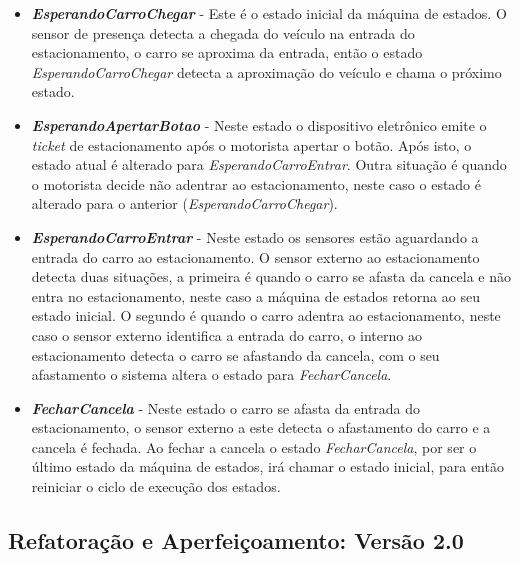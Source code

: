 \begin{itemize}
	\item \textit{\textbf{EsperandoCarroChegar}} - Este é o estado inicial da máquina de estados. O sensor de presença detecta a chegada do veículo na entrada do estacionamento, o carro se aproxima da entrada, então o estado \textit{EsperandoCarroChegar} detecta a aproximação do veículo e chama o próximo estado.
	
	\item \textit{\textbf{EsperandoApertarBotao}} - Neste estado o dispositivo eletrônico emite o \textit{ticket} de estacionamento após o motorista apertar o botão. Após isto, o estado atual é alterado para \textit{EsperandoCarroEntrar}. Outra situação é quando o motorista decide não adentrar ao estacionamento, neste caso o estado é alterado para o anterior (\textit{EsperandoCarroChegar}). 
	
	\item \textit{\textbf{EsperandoCarroEntrar}} - Neste estado os sensores estão aguardando a entrada do carro ao estacionamento. O sensor externo ao estacionamento detecta duas situações, a primeira é quando o carro se afasta da cancela e não entra no estacionamento, neste caso a máquina de estados retorna ao seu estado inicial. O segundo é quando o carro adentra ao estacionamento, neste caso o sensor externo identifica a entrada do carro, o interno ao estacionamento detecta o carro se afastando da cancela, com o seu afastamento o sistema altera o estado para \textit{FecharCancela}.
	
	\item \textit{\textbf{FecharCancela}} - Neste estado o carro se afasta da entrada do estacionamento, o sensor externo a este detecta o afastamento do carro e a cancela é fechada. Ao fechar a cancela o estado \textit{FecharCancela}, por ser o último estado da máquina de estados, irá chamar o estado inicial, para então reiniciar o ciclo de execução dos estados.
	
\end{itemize}


\subsection{Refatoração e Aperfeiçoamento: Versão 2.0} \label{subsec:versao2}

